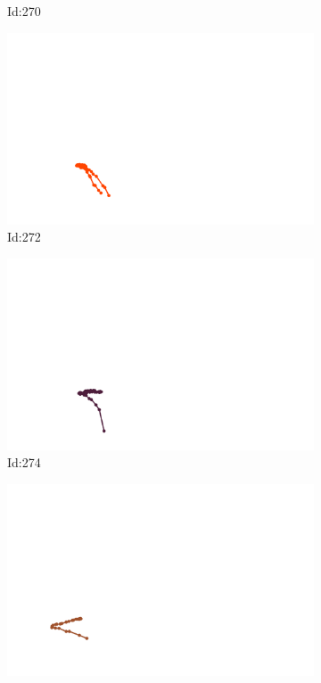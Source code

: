 \documentclass[12pt,twoside]{report}
\begin{document}
\begin{figure}
\begin{subfigure}[b]{0.20\textwidth}
\caption{Id:270}
\end{subfigure}
\begin{subfigure}[b]{0.20\textwidth}
\centering
\includegraphics[width=\textwidth]{../../trajectories/272.png}
\caption{Id:272}
\end{subfigure}
\begin{subfigure}[b]{0.20\textwidth}
\centering
\includegraphics[width=\textwidth]{../../trajectories/274.png}
\caption{Id:274}
\end{subfigure}
\begin{subfigure}[b]{0.20\textwidth}
\centering
\includegraphics[width=\textwidth]{../../trajectories/275.png}

\end{subfigure}
\end{figure}
\end{document}
